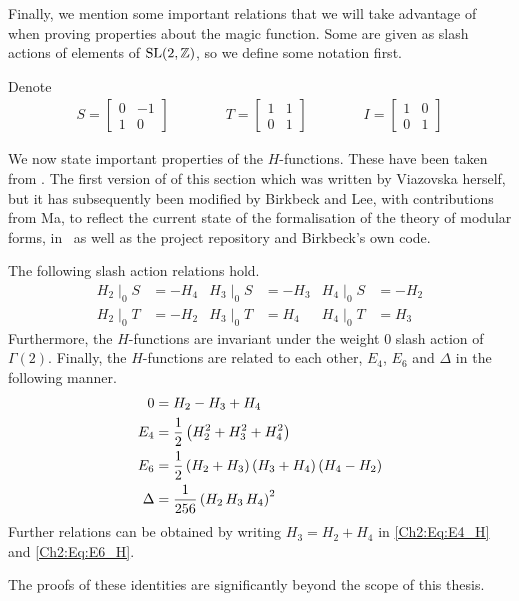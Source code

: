 Finally, we mention some important relations that we will take advantage of when proving properties about the magic function. Some are given as slash actions of elements of $\operatorname{SL}\!\left( 2, \mathbb{Z} \right)$, so we define some notation first.

\begin{boxnotation}
    Denote
    \begin{align*}
        S = \begin{bmatrix}
            0 & -1 \\ 1 & 0
        \end{bmatrix}
        \qquad \qquad
        T = \begin{bmatrix}
            1 & 1 \\ 0 & 1
        \end{bmatrix}
        \qquad \qquad
        I = \begin{bmatrix}
            1 & 0 \\ 0 & 1
        \end{bmatrix}
    \end{align*}
\end{boxnotation}

We now state important properties of the $H$-functions. These have been taken from \cite[\S 6]{blueprint}. The first version of of this section which was written by Viazovska herself, but it has subsequently been modified by Birkbeck and Lee, with contributions from Ma, to reflect the current state of the formalisation of the theory of modular forms, in \mathlib\ as well as the project repository and Birkbeck's own code.

\begin{boxproposition}\label{Ch2:Prop:H_Rels}
    The following slash action relations hold.
    \begin{align*}
        H_2 \mid_0 S &= -H_4
        &
        H_3 \mid_0 S &= -H_3
        &
        H_4 \mid_0 S &= -H_2
        \\
        H_2 \mid_0 T &= -H_2
        &
        H_3 \mid_0 T &= H_4
        &
        H_4 \mid_0 T &= H_3
    \end{align*}
    Furthermore, the $H$-functions are invariant under the weight $0$ slash action of $\Gamma(2)$. Finally, the $H$-functions are related to each other, $E_4$, $E_6$ and $\Delta$ in the following manner.
    \begin{align}
        0 &= H_2 - H_3 + H_4 \label{Ch2:Eq:H_Jacobi} \\
        E_4 &= \frac{1}{2} \left( H_2^2 + H_3^2 + H_4^2 \right) \label{Ch2:Eq:E4_H} \\
        E_6 &= \frac{1}{2} \left( H_2 + H_3 \right)\left( H_3 + H_4 \right)\left( H_4 - H_2 \right) \label{Ch2:Eq:E6_H} \\
        \Delta &= \frac{1}{256} \left( H_2 \, H_3 \, H_4 \right)^2 \label{Ch2:Eq:Disc_H}
    \end{align}
    Further relations can be obtained by writing $H_3 = H_2 + H_4$ in \eqref{Ch2:Eq:E4_H} and \eqref{Ch2:Eq:E6_H}.
\end{boxproposition}

The proofs of these identities are significantly beyond the scope of this thesis.

